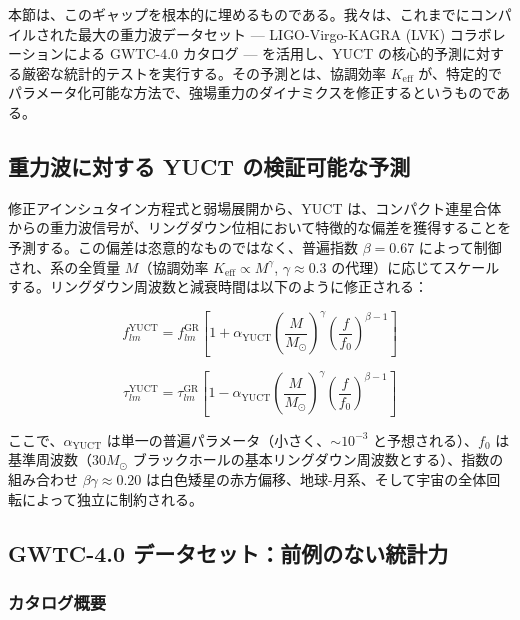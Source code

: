 \documentclass[11pt,a4paper]{article}
\theoremstyle{remark}
\newcommand{\Keff}{K_{\mathrm{eff}}}
\begin{document}
	本節は、このギャップを根本的に埋めるものである。我々は、これまでにコンパイルされた最大の重力波データセット — LIGO-Virgo-KAGRA (LVK) コラボレーションによる GWTC-4.0 カタログ — を活用し、YUCT の核心的予測に対する厳密な統計的テストを実行する。その予測とは、協調効率 $\Keff$ が、特定的でパラメータ化可能な方法で、強場重力のダイナミクスを修正するというものである。
	
	\subsection{重力波に対する YUCT の検証可能な予測}
	
	修正アインシュタイン方程式と弱場展開から、YUCT は、コンパクト連星合体からの重力波信号が、リングダウン位相において特徴的な偏差を獲得することを予測する。この偏差は恣意的なものではなく、普遍指数 $\beta = 0.67$ によって制御され、系の全質量 $M$（協調効率 $\Keff \propto M^{\gamma}$, $\gamma \approx 0.3$ の代理）に応じてスケールする。リングダウン周波数と減衰時間は以下のように修正される：
	
	\begin{equation}
		f_{lm}^{\text{YUCT}} = f_{lm}^{\text{GR}} \left[ 1 + \alpha_{\text{YUCT}} \left( \frac{M}{M_\odot} \right)^{\gamma} \left( \frac{f}{f_0} \right)^{\beta-1} \right]
		\label{eq:freq-mod}
	\end{equation}
	
	\begin{equation}
		\tau_{lm}^{\text{YUCT}} = \tau_{lm}^{\text{GR}} \left[ 1 - \alpha_{\text{YUCT}} \left( \frac{M}{M_\odot} \right)^{\gamma} \left( \frac{f}{f_0} \right)^{\beta-1} \right]
		\label{eq:tau-mod}
	\end{equation}
	
	ここで、$\alpha_{\text{YUCT}}$ は単一の普遍パラメータ（小さく、$\sim 10^{-3}$ と予想される）、$f_0$ は基準周波数（$30 M_\odot$ ブラックホールの基本リングダウン周波数とする）、指数の組み合わせ $\beta\gamma \approx 0.20$ は白色矮星の赤方偏移、地球-月系、そして宇宙の全体回転によって独立に制約される。
	
	\subsection{GWTC-4.0 データセット：前例のない統計力}
	
	\subsubsection{カタログ概要}
	
\end{document}

